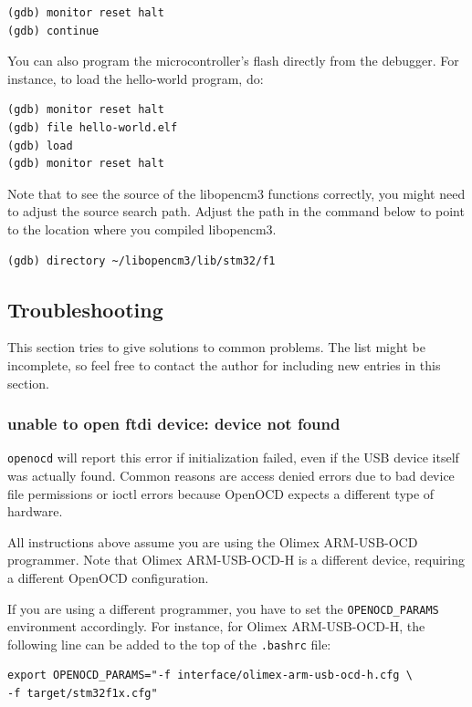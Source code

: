 \documentclass[a4paper, 10pt]{article}
\begin{document}
\begin{verbatim}
(gdb) monitor reset halt
(gdb) continue
\end{verbatim}

You can also program the microcontroller's flash directly from the debugger. For
instance, to load the hello-world program, do:

\begin{verbatim}
(gdb) monitor reset halt
(gdb) file hello-world.elf
(gdb) load
(gdb) monitor reset halt
\end{verbatim}

Note that to see the source of the libopencm3 functions correctly, you might
need to adjust the source search path. Adjust the path in the command below to
point to the location where you compiled libopencm3.

\begin{verbatim}
(gdb) directory ~/libopencm3/lib/stm32/f1
\end{verbatim}

\newpage

\subsection{Troubleshooting}

This section tries to give solutions to common problems.  The list might be
incomplete, so feel free to contact the author for including new entries in
this section.

\subsubsection{unable to open ftdi device: device not found}

\verb|openocd| will report this error if initialization failed, even if
the USB device itself was actually found. Common reasons are access denied
errors due to bad device file permissions or ioctl errors because OpenOCD
expects a different type of hardware.

All instructions above assume you are using the Olimex ARM-USB-OCD
programmer. Note that Olimex ARM-USB-OCD-H is a different device, requiring
a different OpenOCD configuration.

If you are using a different programmer, you have to set the
\verb|OPENOCD_PARAMS| environment accordingly. For instance, for Olimex
ARM-USB-OCD-H, the following line can be added to the top of the
\verb|.bashrc| file:

\begin{verbatim}
export OPENOCD_PARAMS="-f interface/olimex-arm-usb-ocd-h.cfg \
-f target/stm32f1x.cfg"
\end{verbatim}
\end{document}
